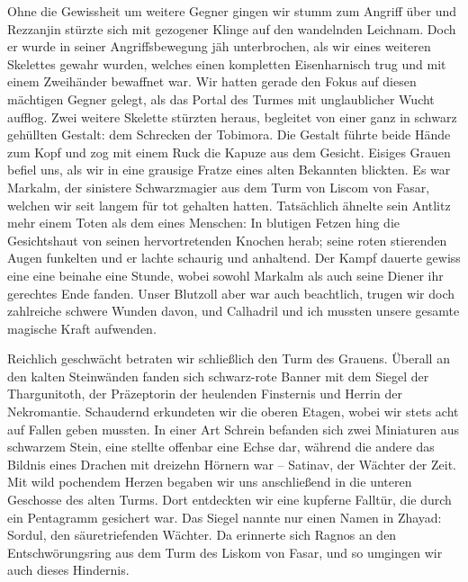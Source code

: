 Ohne die Gewissheit um weitere Gegner gingen wir stumm zum Angriff über und Rezzanjin stürzte sich mit gezogener Klinge auf den wandelnden Leichnam. Doch er wurde in seiner Angriffsbewegung jäh unterbrochen, als wir eines weiteren Skelettes gewahr wurden, welches einen kompletten Eisenharnisch trug und mit einem Zweihänder bewaffnet war. Wir hatten gerade den Fokus auf diesen mächtigen Gegner gelegt, als das Portal des Turmes mit unglaublicher Wucht aufflog. Zwei weitere Skelette stürzten heraus, begleitet von einer ganz in schwarz gehüllten Gestalt: dem Schrecken der Tobimora. Die Gestalt führte beide Hände zum Kopf und zog mit einem Ruck die Kapuze aus dem Gesicht. Eisiges Grauen befiel uns, als wir in eine grausige Fratze eines alten Bekannten blickten. Es war Markalm, der sinistere Schwarzmagier aus dem Turm von Liscom  von Fasar, welchen wir seit langem für tot gehalten hatten. Tatsächlich ähnelte sein Antlitz mehr einem Toten als dem eines Menschen: In blutigen Fetzen hing die Gesichtshaut von seinen hervortretenden Knochen herab; seine roten stierenden Augen funkelten und er lachte schaurig und anhaltend. Der Kampf dauerte gewiss eine eine beinahe eine Stunde, wobei sowohl Markalm als auch seine Diener ihr gerechtes Ende fanden. Unser Blutzoll aber war auch beachtlich, trugen wir doch zahlreiche schwere Wunden davon, und Calhadril und ich mussten unsere gesamte magische Kraft aufwenden. 


Reichlich geschwächt betraten wir schließlich den Turm des Grauens. Überall an den kalten Steinwänden fanden sich schwarz-rote Banner mit dem Siegel der Thargunitoth, der Präzeptorin der heulenden Finsternis und Herrin der Nekromantie. Schaudernd erkundeten wir die oberen Etagen, wobei wir stets acht auf Fallen geben mussten. In einer Art Schrein befanden sich zwei Miniaturen aus schwarzem Stein, eine stellte offenbar eine Echse dar, während die andere das Bildnis eines Drachen mit dreizehn Hörnern war -- Satinav, der Wächter der Zeit. Mit wild pochendem Herzen begaben wir uns anschließend in die unteren Geschosse des alten Turms. Dort entdeckten wir eine kupferne Falltür, die durch ein Pentagramm gesichert war. Das Siegel nannte nur einen Namen in Zhayad: Sordul, den säuretriefenden Wächter. Da erinnerte sich Ragnos an den Entschwörungsring aus dem Turm des Liskom von Fasar, und so umgingen wir auch dieses Hindernis.


